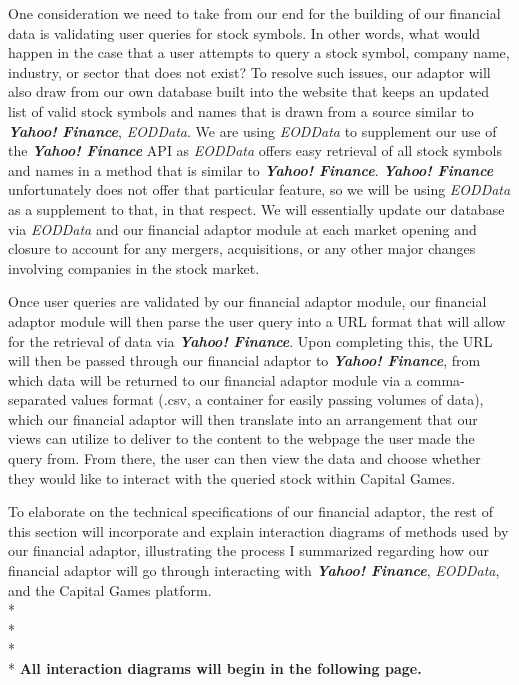 One consideration we need to take from our end for the building of our financial data is validating user queries for stock symbols. In other words, what would happen in the case that a user attempts to query a stock symbol, company name, industry, or sector that does not exist? To resolve such issues, our adaptor will also draw from our own database built into the website that keeps an updated list of valid stock symbols and names that is drawn from a source similar to {\textit{\textbf{Yahoo! Finance}}}, {\textit{EODData}}. We are using {\textit{EODData}} to supplement our use of the {\textit{\textbf{Yahoo! Finance}}} API as {\textit{EODData}} offers easy retrieval of all stock symbols and names in a method that is similar to {\textit{\textbf{Yahoo! Finance}}}. {\textit{\textbf{Yahoo! Finance}}} unfortunately does not offer that particular feature, so we will be using {\textit{EODData}} as a supplement to that, in that respect. We will essentially update our database via {\textit{EODData}} and our financial adaptor module at each market opening and closure to account for any mergers, acquisitions, or any other major changes involving companies in the stock market.

Once user queries are validated by our financial adaptor module, our financial adaptor module will then parse the user query into a URL format that will allow for the retrieval of data via {\textit{\textbf{Yahoo! Finance}}}. Upon completing this, the URL will then be passed through our financial adaptor to {\textit{\textbf{Yahoo! Finance}}}, from which data will be returned to our financial adaptor module via a comma-separated values format (.csv, a container for easily passing volumes of data), which our financial adaptor will then translate into an arrangement that our views can utilize to deliver to the content to the webpage the user made the query from.  From there, the user can then view the data and choose whether they would like to interact with the queried stock within Capital Games.

To elaborate on the technical specifications of our financial adaptor, the rest of this section will incorporate and explain interaction diagrams of methods used by our financial adaptor, illustrating the process I summarized regarding how our financial adaptor will go through interacting with {\textit{\textbf{Yahoo! Finance}}}, {\textit{EODData}}, and the Capital Games platform.
\\*
\\*
\\*
\\*
{\textbf{All interaction diagrams will begin in the following page.}}
\newpage


